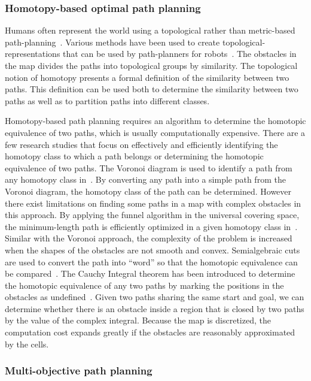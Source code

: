 \documentclass[phd]{byuprop}
\begin{document}
\subsubsection{Homotopy-based optimal path planning}

Humans often represent the world using a topological rather than metric-based path-planning~\cite{Aginsky1997,kuipers1999}. 
Various methods have been used to create topological-representations that can be used by path-planners for robots~\cite{Mataric1992,Thrun1998,Fasola2013,Shah2013}.
The obstacles in the map divides the paths into topological groups by similarity. 
The topological notion of homotopy presents a formal definition of the similarity between two paths. 
This definition can be used both to determine the similarity between two paths as well as to partition paths into different classes.

Homotopy-based path planning requires an algorithm to determine the homotopic equivalence of two paths, which is usually computationally expensive. 
There are a few research studies that focus on effectively and efficiently identifying the homotopy class to which a path belongs or determining the homotopic equivalence of two paths. 
The Voronoi diagram is used to identify a path from any homotopy class in~\cite{Banerjee2013}. 
By converting any path into a simple path from the Voronoi diagram, the homotopy class of the path can be determined. 
However there exist limitations on finding some paths in a map with complex obstacles in this approach.
By applying the funnel algorithm in the universal covering space, the minimum-length path is efficiently optimized in a given homotopy class in~\cite{Hershberger1994}. 
Similar with the Voronoi approach, the complexity of the problem is increased when the shapes of the obstacles are not smooth and convex. 
Semialgebraic cuts are used to convert the path into “word” so that the homotopic equivalence can be compared~\cite{Grigoriev1998}. 
The Cauchy Integral theorem has been introduced to determine the homotopic equivalence of any two paths by marking the positions in the obstacles as undefined~\cite{Bhattachary2010}. 
Given two paths sharing the same start and goal, we can determine whether there is an obstacle inside a region that is closed by two paths by the value of the complex integral. 
Because the map is discretized, the computation cost expands greatly if the obstacles are reasonably approximated by the cells.

\subsubsection{Multi-objective path planning}
\end{document}
